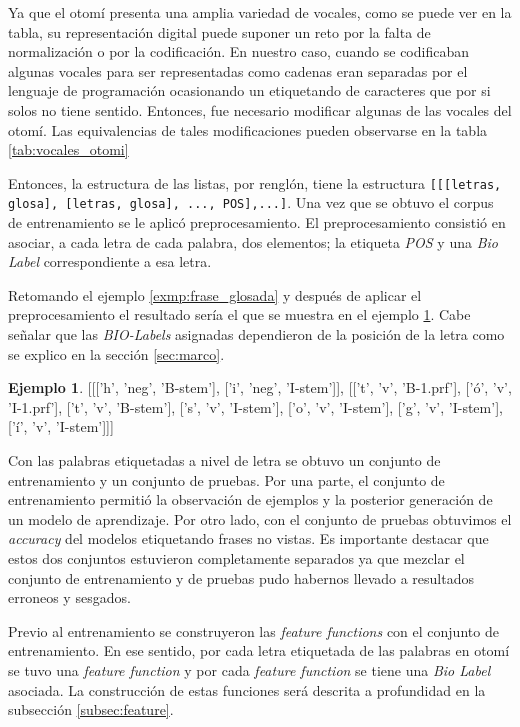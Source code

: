 \documentclass[letterpaper,12pt,oneside]{book}
\def\code#1{\texttt{#1}}
\theoremstyle{definition}
\newtheorem{exmp}{Ejemplo}[section]
\begin{document}
Ya que el otomí presenta una amplia variedad de vocales, como se puede ver en la tabla, su representación digital puede suponer un reto por la falta de normalización o por la codificación. En nuestro caso, cuando se codificaban algunas vocales para ser representadas como cadenas eran separadas por el lenguaje de programación ocasionando un etiquetando de caracteres que por si solos no tiene sentido. Entonces, fue necesario modificar algunas de las vocales del otomí. Las equivalencias de tales modificaciones pueden observarse en la tabla \ref{tab:vocales_otomi}

Entonces, la estructura de las listas, por renglón, tiene la estructura \code{[[[letras, glosa], [letras, glosa], ..., POS],...]}. Una vez que se obtuvo el corpus de entrenamiento se le aplicó preprocesamiento. El preprocesamiento consistió en asociar, a cada letra de cada palabra, dos elementos; la etiqueta \textit{POS} y una \textit{Bio Label} correspondiente a esa letra.

Retomando el ejemplo \ref{exmp:frase_glosada} y después de aplicar el preprocesamiento el resultado sería el que se muestra en el ejemplo \ref{exmp:frase_preproc}. Cabe señalar que las \textit{BIO-Labels} asignadas dependieron de la posición de la letra como se explico en la sección \ref{sec:marco}.

\begin{exmp} \label{exmp:frase_preproc}
    \textsf{[[['h', 'neg', 'B-stem'], ['i', 'neg', 'I-stem']], [['t', 'v', 'B-1.prf'],
          ['ó', 'v', 'I-1.prf'],
          ['t', 'v', 'B-stem'],
          ['s', 'v', 'I-stem'],
          ['o', 'v', 'I-stem'],
          ['g', 'v', 'I-stem'],
          ['í', 'v', 'I-stem']]]}
\end{exmp}

Con las palabras etiquetadas a nivel de letra se obtuvo un conjunto de entrenamiento y un conjunto de pruebas. Por una parte, el conjunto de entrenamiento permitió la observación de ejemplos y la posterior generación de un modelo de aprendizaje. Por otro lado, con el conjunto de pruebas obtuvimos el \textit{accuracy} del modelos etiquetando frases no vistas. Es importante destacar que estos dos conjuntos estuvieron completamente separados ya que mezclar el conjunto de entrenamiento y de pruebas pudo habernos llevado a resultados erroneos y sesgados.

Previo al entrenamiento se construyeron las \textit{feature functions} con el conjunto de entrenamiento. En ese sentido, por cada letra etiquetada de las palabras en otomí se tuvo una \textit{feature function} y por cada \textit{feature function} se tiene una \textit{Bio Label} asociada. La construcción de estas funciones será descrita a profundidad en la subsección \ref{subsec:feature}.
\end{document}
